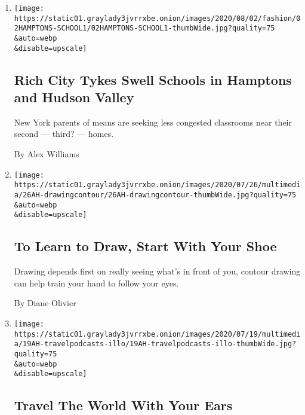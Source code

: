\begin{enumerate}
\def\labelenumi{\arabic{enumi}.}
\item
  \href{/2020/08/01/style/wealthy-rich-parents-coronavirus-schools-hamptons.html}{}

  \texttt{[image: https://static01.graylady3jvrrxbe.onion/images/2020/08/02/fashion/02HAMPTONS-SCHOOL1/02HAMPTONS-SCHOOL1-thumbWide.jpg?quality=75\\\&auto=webp\\\&disable=upscale]}

  \hypertarget{rich-city-tykes-swell-schools-in-hamptons-and-hudson-valley}{%
  \subsection{Rich City Tykes Swell Schools in Hamptons and Hudson
  Valley}\label{rich-city-tykes-swell-schools-in-hamptons-and-hudson-valley}}

  New York parents of means are seeking less congested classrooms near
  their second --- third? --- homes.

  By Alex Williams
\item
  \href{/2020/07/25/at-home/coronavirus-learn-to-draw.html}{}

  \texttt{[image: https://static01.graylady3jvrrxbe.onion/images/2020/07/26/multimedia/26AH-drawingcontour/26AH-drawingcontour-thumbWide.jpg?quality=75\\\&auto=webp\\\&disable=upscale]}

  \hypertarget{to-learn-to-draw-start-with-your-shoe}{%
  \subsection{To Learn to Draw, Start With Your
  Shoe}\label{to-learn-to-draw-start-with-your-shoe}}

  Drawing depends first on really seeing what's in front of you, contour
  drawing can help train your hand to follow your eyes.

  By Diane Olivier
\item
  \href{/2020/07/18/at-home/coronavirus-travel-podcasts.html}{}

  \texttt{[image: https://static01.graylady3jvrrxbe.onion/images/2020/07/19/multimedia/19AH-travelpodcasts-illo/19AH-travelpodcasts-illo-thumbWide.jpg?quality=75\\\&auto=webp\\\&disable=upscale]}

  \hypertarget{travel-the-world-with-your-ears}{%
  \subsection{Travel The World With Your
  Ears}\label{travel-the-world-with-your-ears}}


\end{enumerate}
